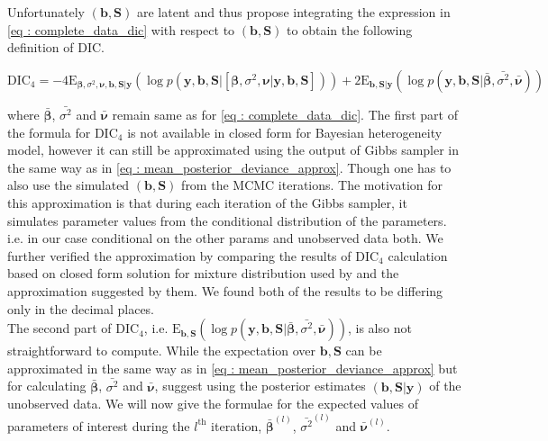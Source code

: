Unfortunately $(\boldsymbol{b}, \boldsymbol{S})$ are latent and thus \citet{celeux_deviance_2006} propose integrating the expression in \ref{eq : complete_data_dic} with respect to $(\boldsymbol{b}, \boldsymbol{S})$ to obtain the following definition of DIC.

\begin{equation}
\label{eq : DIC4}
\text{DIC}_4 = -4\text{E}_{\boldsymbol{\beta}, \sigma^2, \boldsymbol{\nu},\boldsymbol{b}, \boldsymbol{S}|\boldsymbol{y}}(\log{p(\boldsymbol{y}, \boldsymbol{b}, \boldsymbol{S}|[\boldsymbol{\beta}, \sigma^2, \boldsymbol{\nu}|\boldsymbol{y}, \boldsymbol{b}, \boldsymbol{S}])}) + 
2\text{E}_{\boldsymbol{b},\boldsymbol{S}|\boldsymbol{y}}(\log{p(\boldsymbol{y}, \boldsymbol{b}, \boldsymbol{S}|\boldsymbol{\bar{\beta}}, \bar{\sigma^2}, \boldsymbol{\bar{\nu}})})
\end{equation}

where 
$\boldsymbol{\bar{\beta}}$, $\bar{\sigma^2}$ and $\boldsymbol{\bar{\nu}}$ remain same as for \ref{eq : complete_data_dic}. The first part of the formula for $\text{DIC}_4$ is not available in closed form for Bayesian heterogeneity model, however it can still be approximated using the output of Gibbs sampler in the same way as in \ref{eq : mean_posterior_deviance_approx}. Though one has to also use the simulated $(\boldsymbol{b}, \boldsymbol{S})$ from the MCMC iterations. The motivation for this approximation is that during each iteration of the Gibbs sampler, it simulates parameter values from the conditional distribution of the parameters. i.e. in our case conditional on the other params and unobserved data both. We further verified the approximation by comparing the results of $\text{DIC}_4$ calculation based on closed form solution for mixture distribution used by \citet{celeux_deviance_2006} and the approximation suggested by them. We found both of the results to be differing only in the decimal places.\\

The second part of $\text{DIC}_4$, i.e. $\text{E}_{\boldsymbol{b},\boldsymbol{S}}(\log{p(\boldsymbol{y}, \boldsymbol{b}, \boldsymbol{S}|\boldsymbol{\bar{\beta}}, \bar{\sigma^2}, \boldsymbol{\bar{\nu}})})$, is also not straightforward to compute. While the expectation over $\boldsymbol{b}, \boldsymbol{S}$ can be approximated in the same way as in \ref{eq : mean_posterior_deviance_approx} but for calculating $\boldsymbol{\bar{\beta}}$, $\bar{\sigma^2}$ and $\boldsymbol{\bar{\nu}}$, \citet{celeux_deviance_2006} suggest using the posterior estimates $(\boldsymbol{b}, \boldsymbol{S} | \boldsymbol{y})$ of the unobserved data. We will now give the formulae for the expected values of parameters of interest during the $l^\text{th}$ iteration, $\boldsymbol{\bar{\beta}}^{(l)}$, $\bar{\sigma^2}^{(l)}$ and $\boldsymbol{\bar{\nu}}^{(l)}$.

